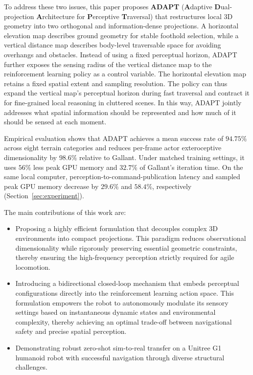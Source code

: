 To address these two issues, this paper proposes \textbf{ADAPT} (\textbf{A}daptive \textbf{D}ual-projection \textbf{A}rchitecture for \textbf{P}erceptive \textbf{T}raversal) that restructures local 3D geometry into two orthogonal and information-dense projections. A horizontal elevation map describes ground geometry for stable foothold selection, while a vertical distance map describes body-level traversable space for avoiding overhangs and obstacles. Instead of using a fixed perceptual horizon, ADAPT further exposes the sensing radius of the vertical distance map to the reinforcement learning policy as a control variable. The horizontal elevation map retains a fixed spatial extent and sampling resolution. The policy can thus expand the vertical map's perceptual horizon during fast traversal and contract it for fine-grained local reasoning in cluttered scenes. In this way, ADAPT jointly addresses what spatial information should be represented and how much of it should be sensed at each moment.

Empirical evaluation shows that ADAPT achieves a mean success rate of $94.75\%$ across eight terrain categories and reduces per-frame actor exteroceptive dimensionality by $98.6\%$ relative to Gallant. Under matched training settings, it uses $56\%$ less peak GPU memory and $32.7\%$ of Gallant's iteration time. On the same local computer, perception-to-command-publication latency and sampled peak GPU memory decrease by $29.6\%$ and $58.4\%$, respectively (Section~\ref{sec:experiment}).

The main contributions of this work are:
\begin{itemize}
    \item Proposing a highly efficient formulation that decouples complex 3D environments into compact projections. This paradigm reduces observational dimensionality while rigorously preserving essential geometric constraints, thereby ensuring the high-frequency perception strictly required for agile locomotion.
    \item Introducing a bidirectional closed-loop mechanism that embeds perceptual configurations directly into the reinforcement learning action space. This formulation empowers the robot to autonomously modulate its sensory settings based on instantaneous dynamic states and environmental complexity, thereby achieving an optimal trade-off between navigational safety and precise spatial perception.
    \item Demonstrating robust zero-shot sim-to-real transfer on a Unitree G1 humanoid robot with successful navigation through diverse structural challenges.
\end{itemize}
